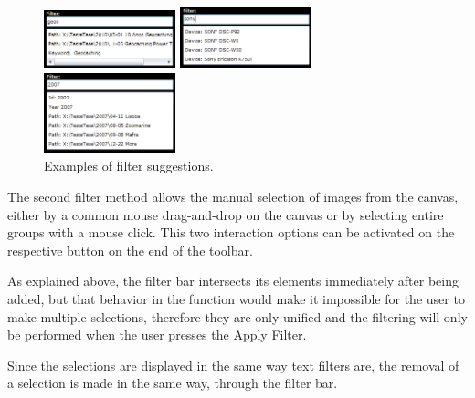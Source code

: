 \begin{figure}
	\vspace{-8pt}
	\begin{center}
		\includegraphics[width=0.34\textwidth]{Figures/filter_0000_geoc.png}

		\vspace{7pt}

		\includegraphics[width=0.34\textwidth]{Figures/filter_0001_sony.png}

		\vspace{7pt}

		\includegraphics[width=0.34\textwidth]{Figures/filter_0004_2007.png}
	\end{center}
	\vspace{-25pt}
	\caption{Examples of filter suggestions.}
	\vspace{-25pt}
	\label{fig:filter}
\end{figure}

The second filter method allows the manual selection of images from the canvas, either by a common mouse drag-and-drop on the canvas or by selecting entire groups with a mouse click. This two interaction options can be activated on the respective button on the end of the toolbar. 

As explained above, the filter bar intersects its elements immediately after being added, but that behavior in the function would make it impossible for the user to make multiple selections, therefore they are only unified and the filtering will only be performed when the user presses the Apply Filter.

Since the selections are displayed in the same way text filters are, the removal of a selection is made in the same way, through the filter bar.




